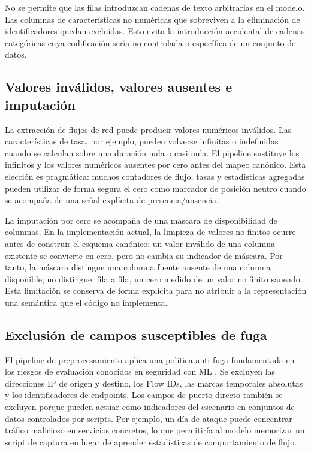 No se permite que las filas introduzcan cadenas de texto arbitrarias en el modelo. Las columnas de características no numéricas que sobreviven a la eliminación de identificadores quedan excluidas. Esto evita la introducción accidental de cadenas categóricas cuya codificación sería no controlada o específica de un conjunto de datos.

\subsection{Valores inválidos, valores ausentes e imputación}
La extracción de flujos de red puede producir valores numéricos inválidos. Las características de tasa, por ejemplo, pueden volverse infinitas o indefinidas cuando se calculan sobre una duración nula o casi nula. El pipeline sustituye los infinitos y los valores numéricos ausentes por cero antes del mapeo canónico. Esta elección es pragmática: muchos contadores de flujo, tasas y estadísticas agregadas pueden utilizar de forma segura el cero como marcador de posición neutro cuando se acompaña de una señal explícita de presencia/ausencia.

La imputación por cero se acompaña de una máscara de disponibilidad de columnas. En la implementación actual, la limpieza de valores no finitos ocurre antes de construir el esquema canónico: un valor inválido de una columna existente se convierte en cero, pero no cambia su indicador de máscara. Por tanto, la máscara distingue una columna fuente ausente de una columna disponible; no distingue, fila a fila, un cero medido de un valor no finito saneado. Esta limitación se conserva de forma explícita para no atribuir a la representación una semántica que el código no implementa.

\subsection{Exclusión de campos susceptibles de fuga}
El pipeline de preprocesamiento aplica una política anti-fuga fundamentada en los riesgos de evaluación conocidos en seguridad con ML \parencite{Arp2020DosDontsMLSecurity,Kaufman2011LeakageDataMining}. Se excluyen las direcciones IP de origen y destino, los Flow IDs, las marcas temporales absolutas y los identificadores de endpoints. Los campos de puerto directo también se excluyen porque pueden actuar como indicadores del escenario en conjuntos de datos controlados por scripts. Por ejemplo, un día de ataque puede concentrar tráfico malicioso en servicios concretos, lo que permitiría al modelo memorizar un script de captura en lugar de aprender estadísticas de comportamiento de flujo.

